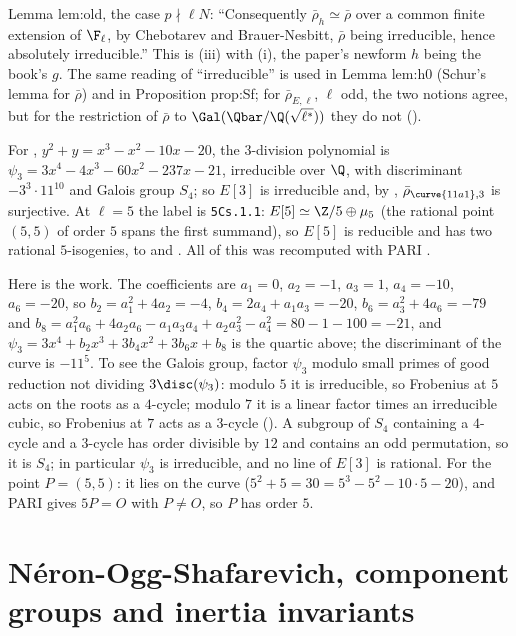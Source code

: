 \begin{paperlink}
Lemma lem:old, the case $p\nmid\ell N$: ``Consequently $\bar\rho_h\simeq\bar\rho$ over a common finite extension of $\F_\ell$, by Chebotarev and
Brauer-Nesbitt, $\bar\rho$ being irreducible, hence absolutely irreducible.'' This is (iii) with (i), the paper's
newform $h$ being the book's $g$. The same
reading of ``irreducible'' is used in Lemma lem:h0 (Schur's lemma for $\bar\rho$) and in Proposition prop:Sf; for $\bar\rho_{E,\ell}$, $\ell$ odd, the two
notions agree, but for the restriction of $\bar\rho$ to $\Gal(\Qbar/\Q(\sqrt{\ell^*}))$ they do not ().
\end{paperlink}

\begin{example}\label{ex:galrep:eleven}
For , $y^2+y=x^3-x^2-10x-20$, the $3$-division polynomial is $\psi_3=3x^4-4x^3-60x^2-237x-21$, irreducible over $\Q$, with discriminant
$-3^3\cdot11^{10}$ and Galois group $S_4$; so $E[3]$ is irreducible and, by , $\bar\rho_{\curve{11a1},3}$ is surjective. At $\ell=5$
the label is \texttt{5Cs.1.1}: $E[5]\simeq\Z/5\oplus\mu_5$ (the rational point $(5,5)$ of order $5$ spans the first summand), so $E[5]$ is reducible
and  has two rational $5$-isogenies, to  and . All of this was recomputed with PARI \cite{PARI}.

Here is the work. The coefficients are $a_1=0$, $a_2=-1$, $a_3=1$, $a_4=-10$, $a_6=-20$, so $b_2=a_1^2+4a_2=-4$, $b_4=2a_4+a_1a_3=-20$, $b_6=a_3^2+4a_6=-79$ and
$b_8=a_1^2a_6+4a_2a_6-a_1a_3a_4+a_2a_3^2-a_4^2=80-1-100=-21$, and $\psi_3=3x^4+b_2x^3+3b_4x^2+3b_6x+b_8$ is the quartic above; the discriminant of
the curve is $-11^5$. To see the Galois group, factor $\psi_3$ modulo small primes of good reduction not dividing $3\disc(\psi_3)$: modulo $5$ it is
irreducible, so Frobenius at $5$ acts on the roots as a $4$-cycle; modulo $7$ it is a linear factor times an irreducible cubic, so Frobenius at $7$
acts as a $3$-cycle (). A subgroup of $S_4$ containing a $4$-cycle and a $3$-cycle has order divisible by $12$ and contains an odd
permutation, so it is $S_4$; in particular $\psi_3$ is irreducible, and no line of $E[3]$ is rational. For the point $P=(5,5)$: it lies on the
curve ($5^2+5=30=5^3-5^2-10\cdot5-20$), and PARI gives $5P=O$ with $P\ne O$, so $P$ has order $5$.
\end{example}

\section[N\'eron-Ogg-Shafarevich and inertia invariants]{N\'eron-Ogg-Shafarevich, component groups and inertia invariants}\label{sec:galrep:nos}

